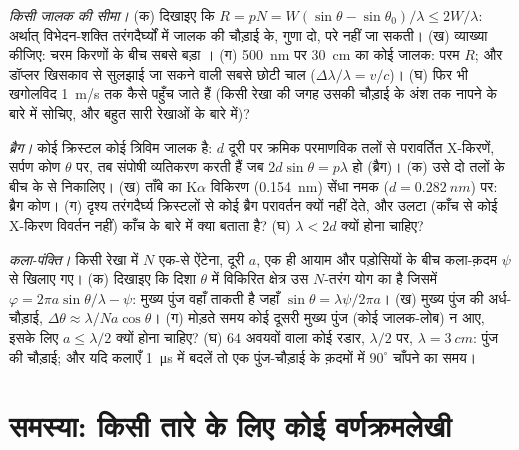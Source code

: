 \begin{exercise}[$\star\star\star$]\label{exo:b2:gratings:10}
\emph{किसी जालक की सीमा।} (क) दिखाइए कि $R = pN = W(\sin\theta - \sin\theta_0)
/\lambda \le 2W/\lambda$: अर्थात् विभेदन-शक्ति तरंगदैर्घ्यों में जालक की चौड़ाई के,
गुणा दो, परे नहीं जा सकती। (ख) व्याख्या कीजिए: चरम किरणों के बीच सबसे बड़ा
। (ग) \qty{500}{nm} पर \qty{30}{cm} का कोई जालक:
परम $R$; और डॉप्लर खिसकाव से सुलझाई जा सकने वाली सबसे छोटी चाल
($\Delta\lambda/\lambda = v/c$)। (घ) फिर भी खगोलविद \qty{1}{m/s} तक कैसे पहुँच जाते हैं
(किसी रेखा की जगह उसकी चौड़ाई के अंश तक नापने के बारे में सोचिए,
और बहुत सारी रेखाओं के बारे में)?
\end{exercise}

\begin{exercise}[$\star\star\star$]\label{exo:b2:gratings:11}
\emph{ब्रैग।} कोई क्रिस्टल कोई त्रिविम जालक है: $d$ दूरी पर क्रमिक
परमाणविक तलों से परावर्तित X-किरणें, सर्पण
कोण $\theta$ पर, तब संपोषी व्यतिकरण करती हैं जब $2d\sin\theta = p\lambda$ हो
(ब्रैग)। (क) उसे दो तलों के बीच के  से निकालिए।
(ख) ताँबे का K$\alpha$ विकिरण (\qty{0.154}{nm}) सेंधा नमक ($d = \qty{0.282}{nm}$) पर:
ब्रैग कोण। (ग) दृश्य तरंगदैर्घ्य क्रिस्टलों से कोई ब्रैग
परावर्तन क्यों नहीं देते, और उलटा (काँच से कोई X-किरण
विवर्तन नहीं) काँच के बारे में क्या बताता है? (घ) $\lambda < 2d$ क्यों होना चाहिए?
\end{exercise}

\begin{exercise}[$\star\star\star$]\label{exo:b2:gratings:12}
\emph{कला-पंक्ति।} किसी रेखा में $N$ एक-से ऐंटेना, दूरी $a$, एक ही
आयाम और पड़ोसियों के बीच कला-क़दम $\psi$ से खिलाए गए। (क)
दिखाइए कि दिशा $\theta$ में विकिरित क्षेत्र उस $N$-तरंग योग का है जिसमें
$\varphi = 2\pi a\sin\theta/\lambda - \psi$: मुख्य पुंज वहाँ ताकती है
जहाँ $\sin\theta = \lambda\psi/2\pi a$। (ख) मुख्य पुंज की अर्ध-चौड़ाई, $\Delta\theta
\approx \lambda/Na\cos\theta$। (ग) मोड़ते समय कोई दूसरी मुख्य पुंज (कोई जालक-लोब) न आए,
इसके लिए $a \le \lambda/2$ क्यों होना चाहिए? (घ) $64$ अवयवों वाला कोई रडार, $\lambda/2$ पर,
$\lambda = \qty{3}{cm}$: पुंज की चौड़ाई; और यदि कलाएँ \qty{1}{\micro s} में बदलें तो एक पुंज-चौड़ाई
के क़दमों में $90^\circ$ चाँपने का समय।
\end{exercise}

\section{समस्या: किसी तारे के लिए कोई वर्णक्रमलेखी}

